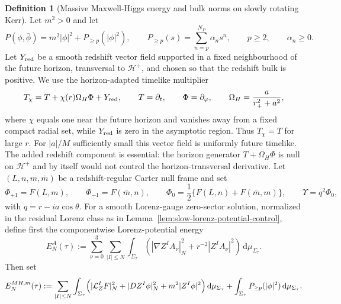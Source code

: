 \documentclass[11pt]{article}
\numberwithin{equation}{section}
\theoremstyle{plain}
\theoremstyle{definition}
\newtheorem{definition}{Definition}[section]
\theoremstyle{remark}
\newcommand{\dd}{\mathrm{d}}
\begin{document}
\begin{definition}[Massive Maxwell-Higgs energy and bulk norms on slowly rotating Kerr]\label{def:slow-massive-energy-norms}
Let \(m^2>0\) and let
\begin{equation}
 P(\phi,\bar\phi)=m^2|\phi|^2+P_{\ge p}(|\phi|^2),
 \qquad
 P_{\ge p}(s)=\sum_{n=p}^{N_P}\alpha_n s^n,
 \qquad p\ge2,
 \qquad \alpha_n\ge0.
\end{equation}
Let \(Y_{\rm red}\) be a smooth redshift vector field supported in a fixed neighbourhood of the future horizon, transversal to \(\mathcal H^+\), and chosen so that the redshift bulk is positive.  We use the horizon-adapted timelike multiplier
\begin{equation}\label{eq:Tchi-slow-definition}
 T_\chi=T+\chi(r)\Omega_H\Phi+Y_{\rm red},
 \qquad
 T=\partial_t,
 \qquad
 \Phi=\partial_\varphi,
 \qquad
 \Omega_H=\frac{a}{r_+^2+a^2},
\end{equation}
where \(\chi\) equals one near the future horizon and vanishes away from a fixed compact radial set, while \(Y_{\rm red}\) is zero in the asymptotic region.  Thus \(T_\chi=T\) for large \(r\).  For \(|a|/M\) sufficiently small this vector field is uniformly future timelike.  The added redshift component is essential: the horizon generator \(T+\Omega_H\Phi\) is null on \(\mathcal H^+\) and by itself would not control the horizon-transversal derivative.  Let \((L,n,m,\bar m)\) be a redshift-regular Carter null frame and set
\begin{equation}\label{eq:slow-maxwell-scalars}
 \Phi_{+1}=F(L,m),
 \qquad
 \Phi_{-1}=F(\bar m,n),
 \qquad
 \Phi_0=\frac12\{F(L,n)+F(\bar m,m)\},
 \qquad
 \Upsilon=q^2\Phi_0,
\end{equation}
with \(q=r-ia\cos\theta\).  For a smooth Lorenz-gauge zero-sector solution, normalized in the residual Lorenz class as in Lemma~\ref{lem:slow-lorenz-potential-control}, define first the componentwise Lorenz-potential energy
\begin{equation}\label{eq:slow-lorenz-potential-energy}
E_N^{A}(\tau):=
\sum_{\nu=0}^{3}\sum_{|I|\le N}\int_{\Sigma_\tau}
\left(|\nabla Z^IA_\nu|_N^2+r^{-2}|Z^IA_\nu|^2\right)\,\dd\mu_{\Sigma_\tau}.
\end{equation}
Then set
\begin{equation}
E_{N}^{MH,m}(\tau)
:=
\sum_{|I|\le N}\int_{\Sigma_\tau}
\Bigl(
 |\mathcal L_{Z}^{I}F|_{N}^{2}
 +|D Z^{I}\phi|_{N}^{2}
 +m^{2}|Z^{I}\phi|^{2}
\Bigr)\,\dd\mu_{\Sigma_\tau}
 +\int_{\Sigma_\tau}P_{\ge p}(|\phi|^{2})\,\dd\mu_{\Sigma_\tau}.
\label{eq:slow-energy-massive-def}

\end{equation}
\end{definition}
\end{document}
